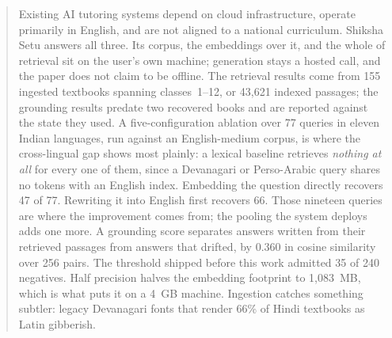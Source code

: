 \begin{abstract}
\ifconf
Existing AI tutoring systems depend on cloud infrastructure, operate primarily in English, and are not aligned to a national curriculum. Shiksha Setu answers all three. Its corpus, the embeddings over it, and the whole of retrieval sit on the user's own machine; generation stays a hosted call, and the paper does not claim to be offline. The retrieval results come from 155 ingested textbooks spanning classes~1--12, or 43{,}621 indexed passages; the grounding results predate two recovered books and are reported against the state they used. A five-configuration ablation over 77 queries in eleven Indian languages, run against an English-medium corpus, is where the cross-lingual gap shows most plainly: a lexical baseline retrieves \emph{nothing at all} for every one of them, since a Devanagari or Perso-Arabic query shares no tokens with an English index. Embedding the question directly recovers 47 of 77. Rewriting it into English first recovers 66. Those nineteen queries are where the improvement comes from; the pooling the system deploys adds one more. A grounding score separates answers written from their retrieved passages from answers that drifted, by 0.360 in cosine similarity over 256 pairs. The threshold shipped before this work admitted 35 of 240 negatives. Half precision halves the embedding footprint to 1{,}083~MB, which is what puts it on a 4~GB machine. Ingestion catches something subtler: legacy Devanagari fonts that render 66\% of Hindi textbooks as Latin gibberish.
\else

\end{abstract}
